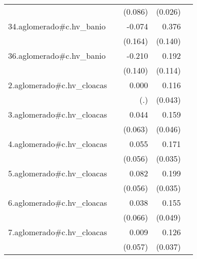 {\begin{longtable}{l*{4}{D{.}{.}{-1}}}
            &                     &     (0.086)         &     (0.026)         &                     \\
\addlinespace
34.aglomerado#c.hv\_banio&                     &      -0.074         &       0.376\sym{**} &                     \\
            &                     &     (0.164)         &     (0.140)         &                     \\
\addlinespace
36.aglomerado#c.hv\_banio&                     &      -0.210         &       0.192         &                     \\
            &                     &     (0.140)         &     (0.114)         &                     \\
\addlinespace
2.aglomerado#c.hv\_cloacas&                     &       0.000         &       0.116\sym{**} &                     \\
            &                     &         (.)         &     (0.043)         &                     \\
\addlinespace
3.aglomerado#c.hv\_cloacas&                     &       0.044         &       0.159\sym{***}&                     \\
            &                     &     (0.063)         &     (0.046)         &                     \\
\addlinespace
4.aglomerado#c.hv\_cloacas&                     &       0.055         &       0.171\sym{***}&                     \\
            &                     &     (0.056)         &     (0.035)         &                     \\
\addlinespace
5.aglomerado#c.hv\_cloacas&                     &       0.082         &       0.199\sym{***}&                     \\
            &                     &     (0.056)         &     (0.035)         &                     \\
\addlinespace
6.aglomerado#c.hv\_cloacas&                     &       0.038         &       0.155\sym{**} &                     \\
            &                     &     (0.066)         &     (0.049)         &                     \\
\addlinespace
7.aglomerado#c.hv\_cloacas&                     &       0.009         &       0.126\sym{***}&                     \\
            &                     &     (0.057)         &     (0.037)         &                     \\

\end{longtable}}
